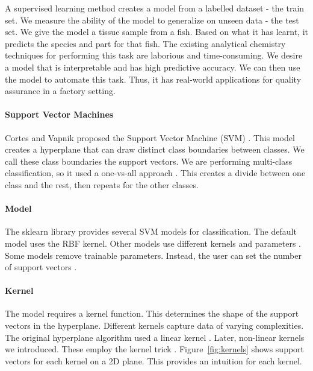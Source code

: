 \documentclass[runningheads]{llncs}
\begin{document}
A supervised learning method creates a model from a labelled dataset - the train set.
We measure the ability of the model to generalize on unseen data - the test set.
We give the model a tissue sample from a fish.
Based on what it has learnt, it predicts the species and part for that fish.
The existing analytical chemistry techniques for performing this task are laborious and time-consuming.
We desire a model that is interpretable and has high predictive accuracy.
We can then use the model to automate this task.
Thus, it has real-world applications for quality assurance in a factory setting.

\paragraph{Support Vector Machines}
\label{sec:background-svm}

Cortes and Vapnik proposed the Support Vector Machine (SVM) \cite{cortes1995support}.
This model creates a hyperplane that can draw distinct class boundaries between classes.
We call these class boundaries the support vectors.
We are performing multi-class classification, so it used a one-vs-all approach \cite{sklearn2021feature}.
This creates a divide between one class and the rest, then repeats for the other classes.

\paragraph{Model}
\label{sec:background-svm-model}

The sklearn library provides several SVM models for classification.
The default model uses the RBF kernel.
Other models use different kernels and parameters \cite{sklearn2021feature}.
Some models remove trainable parameters.
Instead, the user can set the number of support vectors \cite{scholkopf2000new}.

\paragraph{Kernel}
\label{sec:background-svm-kernel}

The model requires a kernel function.
This determines the shape of the support vectors in the hyperplane.
Different kernels capture data of varying complexities.
The original hyperplane algorithm used a linear kernel \cite{aizerman1964theoretical}.
Later, non-linear kernels we introduced.
These employ the kernel trick \cite{boser1992training}.
Figure~\ref{fig:kernels} shows support vectors for each kernel on a 2D plane.
This provides an intuition for each kernel.
\end{document}
